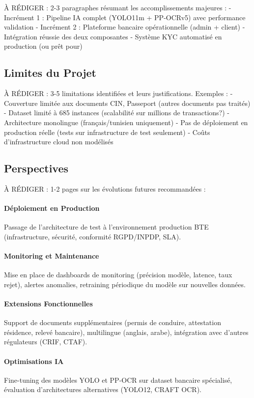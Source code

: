 À RÉDIGER : 2-3 paragraphes résumant les accomplissements majeures :
- Incrément 1 : Pipeline IA complet (YOLO11m + PP-OCRv5) avec performance validation
- Incrément 2 : Plateforme bancaire opérationnelle (admin + client)
- Intégration réussie des deux composantes
- Système KYC automatisé en production (ou prêt pour)

\subsection{Limites du Projet}

À RÉDIGER : 3-5 limitations identifiées et leurs justifications. Exemples :
- Couverture limitée aux documents CIN, Passeport (autres documents pas traités)
- Dataset limité à 685 instances (scalabilité sur millions de transactions?)
- Architecture monolingue (français/tunisien uniquement)
- Pas de déploiement en production réelle (tests sur infrastructure de test seulement)
- Coûts d'infrastructure cloud non modélisés

\subsection{Perspectives}

À RÉDIGER : 1-2 pages sur les évolutions futures recommandées :

\paragraph{Déploiement en Production}
Passage de l'architecture de test à l'environnement production BTE (infrastructure, sécurité, conformité RGPD/INPDP, SLA).

\paragraph{Monitoring et Maintenance}
Mise en place de dashboards de monitoring (précision modèle, latence, taux rejet), alertes anomalies, retraining périodique du modèle sur nouvelles données.

\paragraph{Extensions Fonctionnelles}
Support de documents supplémentaires (permis de conduire, attestation résidence, relevé bancaire), multilingue (anglais, arabe), intégration avec d'autres régulateurs (CRIF, CTAF).

\paragraph{Optimisations IA}
Fine-tuning des modèles YOLO et PP-OCR sur dataset bancaire spécialisé, évaluation d'architectures alternatives (YOLO12, CRAFT OCR).

